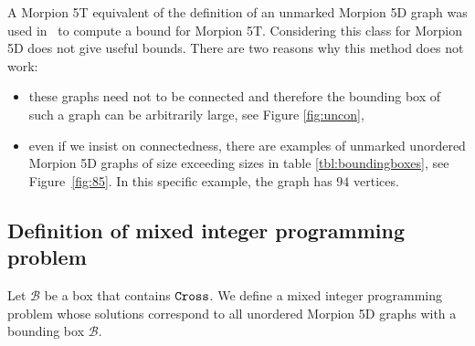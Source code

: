 \begin{remark}
%
A Morpion 5T equivalent of the definition of an unmarked Morpion 5D graph was 
  used in~\cite{ijcai} to compute a bound for Morpion 5T.
Considering this class for Morpion 5D  does not give useful bounds. There are two reasons why this method does not work:
\begin{itemize}
\item these graphs need not to be connected and therefore the bounding box of such a graph
  can be arbitrarily large, see Figure \ref{fig:uncon}, 
\item even if we insist on connectedness, there are examples of unmarked unordered Morpion 5D graphs of size exceeding sizes in 
table \ref{tbl:boundingboxes}, see Figure~\ref{fig:85}. In this specific example, the graph has $94$ vertices.
\end{itemize}
\end{remark}

\subsection{Definition of mixed integer programming problem}

Let $\mathcal{B}$ be a box that contains $\texttt{Cross}$. 
We define a mixed integer programming problem whose solutions correspond to all unordered Morpion 5D graphs with a bounding 
   box $\mathcal{B}$.
  
\newcommand{\mv}{\operatorname{mv}}
\renewcommand{\dt}{\operatorname{dt}}

